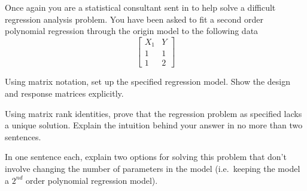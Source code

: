 \documentclass[12pt]{article}
\begin{document}
{
Once again you are a statistical consultant sent in to help solve a difficult regression analysis problem.  You have been asked to fit a second order polynomial regression through the origin model to the following data
\[
\left[
\begin{array}{ccc}
 X_1   & Y  \\
 1 & 1  \\
 1   & 2  
\end{array}
\right]
\]

\abcs
\item Using matrix notation, set up the specified regression model.  Show the design and response matrices explicitly.
\item Using matrix rank identities, prove that the regression problem as specified lacks a unique solution.  Explain the intuition behind your answer in no more than two sentences.  
\item In one sentence each, explain two options for solving this problem that don't involve changing the number of parameters in the model (i.e.~keeping the model a $2^{nd}$ order polynomial regression model).
\endabcs

}
{

\vfill
 \newpage

}
{
}
\end{document}

